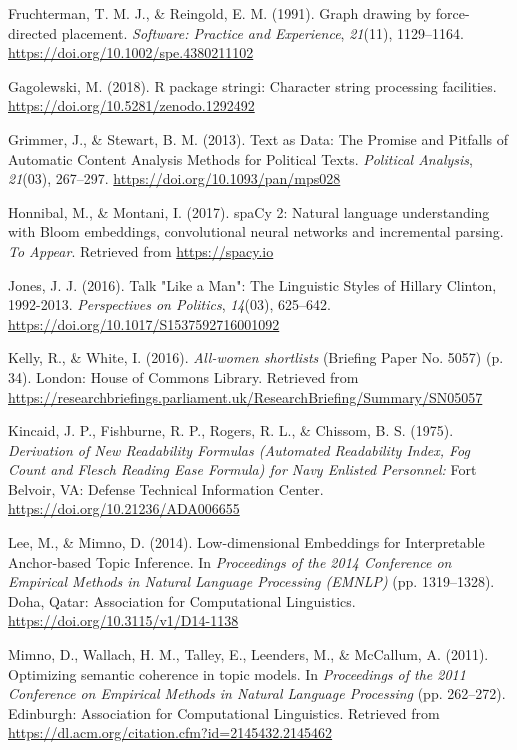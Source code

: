 \documentclass[]{article}
\begin{document}
\leavevmode\hypertarget{ref-fruchterman1991}{}%
Fruchterman, T. M. J., \& Reingold, E. M. (1991). Graph drawing by
force-directed placement. \emph{Software: Practice and Experience},
\emph{21}(11), 1129--1164. \url{https://doi.org/10.1002/spe.4380211102}

\leavevmode\hypertarget{ref-gagolewski2018}{}%
Gagolewski, M. (2018). R package stringi: Character string processing
facilities. \url{https://doi.org/10.5281/zenodo.1292492}

\leavevmode\hypertarget{ref-grimmer2013}{}%
Grimmer, J., \& Stewart, B. M. (2013). Text as Data: The Promise and
Pitfalls of Automatic Content Analysis Methods for Political Texts.
\emph{Political Analysis}, \emph{21}(03), 267--297.
\url{https://doi.org/10.1093/pan/mps028}

\leavevmode\hypertarget{ref-honnibal2017}{}%
Honnibal, M., \& Montani, I. (2017). spaCy 2: Natural language
understanding with Bloom embeddings, convolutional neural networks and
incremental parsing. \emph{To Appear}. Retrieved from
\url{https://spacy.io}

\leavevmode\hypertarget{ref-jones2016}{}%
Jones, J. J. (2016). Talk "Like a Man": The Linguistic Styles of Hillary
Clinton, 1992-2013. \emph{Perspectives on Politics}, \emph{14}(03),
625--642. \url{https://doi.org/10.1017/S1537592716001092}

\leavevmode\hypertarget{ref-kelly2016}{}%
Kelly, R., \& White, I. (2016). \emph{All-women shortlists} (Briefing
Paper No. 5057) (p. 34). London: House of Commons Library. Retrieved
from
\url{https://researchbriefings.parliament.uk/ResearchBriefing/Summary/SN05057}

\leavevmode\hypertarget{ref-kincaid1975}{}%
Kincaid, J. P., Fishburne, R. P., Rogers, R. L., \& Chissom, B. S.
(1975). \emph{Derivation of New Readability Formulas (Automated
Readability Index, Fog Count and Flesch Reading Ease Formula) for Navy
Enlisted Personnel:} Fort Belvoir, VA: Defense Technical Information
Center. \url{https://doi.org/10.21236/ADA006655}

\leavevmode\hypertarget{ref-lee2014c}{}%
Lee, M., \& Mimno, D. (2014). Low-dimensional Embeddings for
Interpretable Anchor-based Topic Inference. In \emph{Proceedings of the
2014 Conference on Empirical Methods in Natural Language Processing
(EMNLP)} (pp. 1319--1328). Doha, Qatar: Association for Computational
Linguistics. \url{https://doi.org/10.3115/v1/D14-1138}

\leavevmode\hypertarget{ref-mimno2011}{}%
Mimno, D., Wallach, H. M., Talley, E., Leenders, M., \& McCallum, A.
(2011). Optimizing semantic coherence in topic models. In
\emph{Proceedings of the 2011 Conference on Empirical Methods in Natural
Language Processing} (pp. 262--272). Edinburgh: Association for
Computational Linguistics. Retrieved from
\url{https://dl.acm.org/citation.cfm?id=2145432.2145462}
\end{document}
